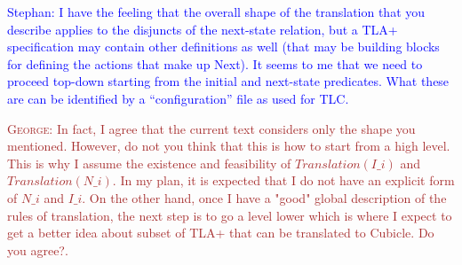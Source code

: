 \documentclass{article}
\theoremstyle{plain}
\numberwithin{equation}{section}
\newcommand{\george}[1]{\textcolor{brown}{\textsc{George: } {\sf #1}}}
\newcommand{\ste}[1]{\par\noindent\textcolor{blue}{\small Stephan: #1}}
\begin{document}
\ste{I have the feeling that the overall shape of the translation that you
  describe applies to the disjuncts of the next-state relation, but a TLA+
  specification may contain other definitions as well (that may be building
  blocks for defining the actions that make up Next). It seems to me that we
  need to proceed top-down starting from the initial and next-state predicates.
  What these are can be identified by a ``configuration'' file as used for TLC.}

  \george{In fact, I agree that the current text considers only the shape you mentioned. However, do not you think that this is how to start from a high level. This is why I assume the existence and feasibility of \emph{$Translation(I\_i)$} and \emph{$Translation(N\_i)$}. In my plan, it is expected that I do not have an explicit form of $N\_i$ and $I\_i$. On the other hand, once I have a "good" global description of the rules of translation, the next step is to go a level lower which is where I expect to get a better idea about subset of TLA+ that can be translated to Cubicle. Do you agree?. }



\end{document}
